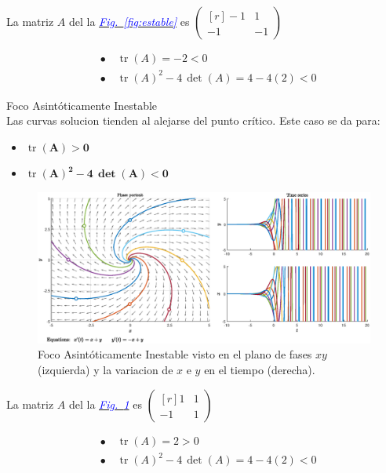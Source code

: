 \documentclass[12pt,a4paper]{report} %
\newcommand{\fref}[1]{\hyperref[#1]{\textcolor{blue}{\textit{Fig.~\ref*{#1}}}}}
\newcommand{\tr}{\operatorname{\textrm{tr}}}
\begin{document}
	La matriz $A$ del la \fref{fig:estable} es 
	$\begin{pmatrix*}[r]
		-1 & 1 \\
		-1 & -1
	\end{pmatrix*}$
	
	\begin{align*}
		&\bullet\quad \tr(A)=-2<0 \\[2mm]
		&\bullet\quad \tr(A)^2-4\, \det(A)=4-4(2)<0
	\end{align*}
	
	\newpage
	
	{\Large\textbullet\quad Foco Asintóticamente Inestable}\\[0.5cm]
	
	Las curvas solucion tienden al alejarse del punto crítico. Este caso se da para: 
	\begin{itemize}
		\item \textbf{$\tr$}$\bm{(A)>0}$
		\item \textbf{$\tr$}$\bm{(A)^2-4\, \det(A)<0}$
	\end{itemize}
	
	\begin{figure}[h]
		\centering
		\includegraphics[width=1\textwidth]{inestable.eps}
		\caption{Foco Asintóticamente Inestable visto en el plano de fases $xy$ (izquierda) y la variacion de $x$ e $y$ en el tiempo (derecha).}
		\label{fig:inestable}
	\end{figure}\smallskip
	
	La matriz $A$ del la \fref{fig:inestable} es 
	 $\begin{pmatrix*}[r]
		 1 & 1 \\
		-1 & 1
	 \end{pmatrix*}$
	
	\begin{align*}
		&\bullet\quad \tr(A)=2>0 \\[2mm]
		&\bullet\quad \tr(A)^2-4\, \det(A)=4-4(2)<0
	\end{align*}
	
\end{document}
